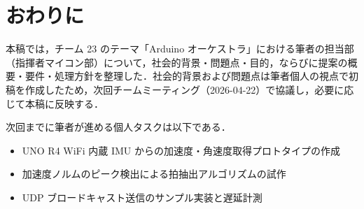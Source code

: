\section{おわりに}
\label{sec:conclusion}

本稿では，チーム 23 のテーマ「Arduino オーケストラ」における筆者の担当部（指揮者マイコン部）について，社会的背景・問題点・目的，ならびに提案の概要・要件・処理方針を整理した．社会的背景および問題点は筆者個人の視点で初稿を作成したため，次回チームミーティング（2026-04-22）で協議し，必要に応じて本稿に反映する．

次回までに筆者が進める個人タスクは以下である．

\begin{itemize}
  \item UNO R4 WiFi 内蔵 IMU からの加速度・角速度取得プロトタイプの作成
  \item 加速度ノルムのピーク検出による拍抽出アルゴリズムの試作
  \item UDP ブロードキャスト送信のサンプル実装と遅延計測
\end{itemize}
